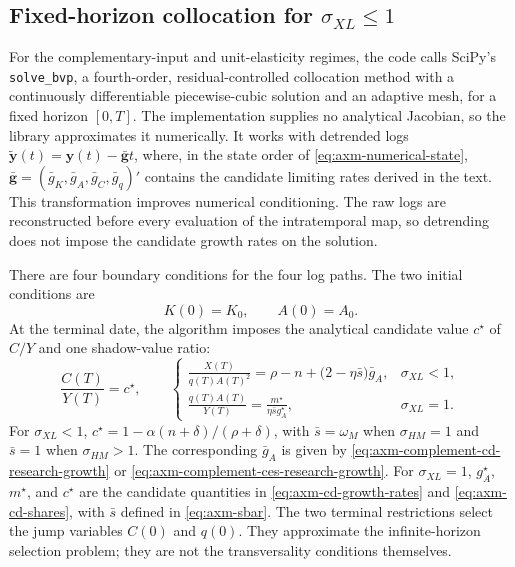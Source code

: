 \subsection{Fixed-horizon collocation for \texorpdfstring{\(\sigma_{XL}\leq1\)}{sigma XL <= 1}}

For the complementary-input and unit-elasticity regimes, the code calls
SciPy's \texttt{solve\_bvp}, a fourth-order, residual-controlled collocation
method with a continuously differentiable piecewise-cubic solution and an
adaptive mesh, for a fixed horizon \([0,T]\). The implementation supplies no
analytical Jacobian, so the library approximates it numerically.
It works with detrended logs
\(\widetilde{\mathbf y}(t)=\mathbf y(t)-\bar{\mathbf g}t\), where, in the state
order of \eqref{eq:axm-numerical-state},
\(\bar{\mathbf g}=(\bar g_K,\bar g_A,\bar g_C,\bar g_q)'\) contains the candidate
limiting rates derived in the text. This transformation improves numerical
conditioning. The raw logs are reconstructed before every evaluation of the
intratemporal map, so detrending does not impose the candidate growth rates on
the solution.

There are four boundary conditions for the four log paths. The two initial
conditions are
\begin{equation}
 K(0)=K_0,\qquad A(0)=A_0.
 \label{eq:axm-fixed-initial-boundary}
\end{equation}
At the terminal date, the algorithm imposes the analytical candidate value
\(c^\star\) of \(C/Y\) and one shadow-value ratio:
\begin{equation}
 \frac{C(T)}{Y(T)}=c^\star,\qquad
 \begin{cases}
 \displaystyle
 \frac{X(T)}{q(T)A(T)^2}
 =\rho-n+\bigl(2-\eta\bar s\bigr)\bar g_A,
 &\sigma_{XL}<1,\\[9pt]
 \displaystyle
 \frac{q(T)A(T)}{Y(T)}
 =\frac{m^\star}{\eta\bar s g_A^\star},
 &\sigma_{XL}=1.
 \end{cases}
 \label{eq:axm-fixed-terminal-boundary}
\end{equation}
For \(\sigma_{XL}<1\),
\(c^\star=1-\alpha(n+\delta)/(\rho+\delta)\), with
\(\bar s=\omega_M\) when \(\sigma_{HM}=1\) and \(\bar s=1\) when
\(\sigma_{HM}>1\). The corresponding \(\bar g_A\) is given by
\eqref{eq:axm-complement-cd-research-growth} or
\eqref{eq:axm-complement-ces-research-growth}. For \(\sigma_{XL}=1\),
\(g_A^\star\), \(m^\star\), and \(c^\star\) are the candidate quantities in
\eqref{eq:axm-cd-growth-rates} and \eqref{eq:axm-cd-shares}, with \(\bar s\)
defined in \eqref{eq:axm-sbar}. The two terminal restrictions select the jump
variables \(C(0)\) and \(q(0)\). They approximate the infinite-horizon selection
problem; they are not the transversality conditions themselves.

